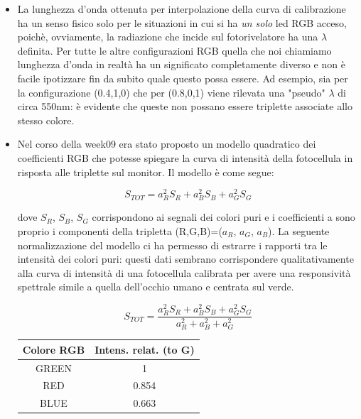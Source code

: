 \documentclass[10pt,letterpaper]{article}
\begin{document}
\begin{itemize}
\item La lunghezza d'onda ottenuta per interpolazione della curva di calibrazione ha un senso fisico solo per le situazioni in cui si ha \textit{un solo} led RGB acceso, poichè, ovviamente, la radiazione che incide sul fotorivelatore ha una $\lambda$ definita. Per tutte le altre configurazioni RGB quella che noi chiamiamo lunghezza d'onda in realtà ha un significato completamente diverso e non è facile ipotizzare fin da subito quale questo possa essere. Ad esempio, sia per la configurazione (0.4,1,0) che per (0.8,0,1) viene rilevata una "pseudo" $\lambda$ di circa 550nm: è evidente che queste non possano essere triplette associate allo stesso colore.

\item Nel corso della week09 era stato proposto un modello quadratico dei coefficienti RGB che potesse spiegare la curva di intensità della fotocellula in risposta alle triplette sul monitor. Il modello è come segue:

\begin{equation}
S_{TOT} = a_R^2 S_R + a_B^2 S_B + a_G^2 S_G
\end{equation}

dove $S_R$, $S_B$, $S_G$ corrispondono ai segnali dei colori puri e i coefficienti a sono proprio i componenti della tripletta (R,G,B)=($a_R$, $a_G$, $a_B$). La seguente normalizzazione del modello ci ha permesso di estrarre i rapporti tra le intensità dei colori puri: questi dati sembrano corrispondere qualitativamente alla curva di intensità di una fotocellula calibrata per avere una responsività spettrale simile a quella dell'occhio umano e centrata sul verde.

\begin{equation}
S_{TOT} = \frac{a_R^2 S_R + a_B^2 S_B + a_G^2 S_G}{a_R^2 + a_B^2 + a_G^2}
\end{equation}

\begin{table}
\centering
\begin{tabular}{c|c}
\hline Colore RGB & Intens. relat. (to G) \\ 
\hline GREEN & 1 \\ 
 RED & 0.854 \\ 
 BLUE & 0.663 \\ 
\hline 
\end{tabular} 
\end{table}
~\\


\end{itemize}
\end{document}

